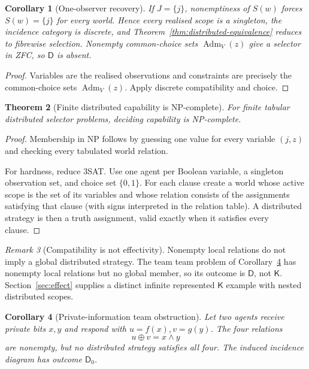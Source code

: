 \documentclass[11pt]{article}
\theoremstyle{plain}
\newtheorem{theorem}{Theorem}[section]
\newtheorem{corollary}[theorem]{Corollary}
\theoremstyle{definition}
\theoremstyle{remark}
\newtheorem{remark}[theorem]{Remark}
\newcommand{\Adm}{\operatorname{Adm}}
\begin{document}
\begin{corollary}[One-observer recovery]\label{cor:distributed-one}
If $J=\{j\}$, nonemptiness of $S(w)$ forces $S(w)=\{j\}$ for every world.
Hence every realised scope is a singleton, the incidence category is discrete,
and Theorem~\ref{thm:distributed-equivalence} reduces to fibrewise selection. Nonempty common-choice sets $\Adm_V(z)$ give a selector in ZFC, so $\mathsf D$ is absent.
\end{corollary}

\begin{proof}
Variables are the realised observations and constraints are precisely the
common-choice sets $\Adm_V(z)$. Apply discrete compatibility and choice.
\end{proof}

\begin{theorem}[Finite distributed capability is NP-complete]
\label{thm:distributed-NP}
For finite tabular distributed selector problems, deciding capability is
NP-complete.
\end{theorem}

\begin{proof}
Membership in NP follows by guessing one value for every variable $(j,z)$ and
checking every tabulated world relation.

For hardness, reduce 3SAT. Use one agent per Boolean variable, a singleton
observation set, and choice set $\{0,1\}$. For each clause create a world whose
active scope is the set of its variables and whose relation consists of the
assignments satisfying that clause (with signs interpreted in the
relation table). A distributed strategy is then a truth assignment, valid
exactly when it satisfies every clause.
\end{proof}

\begin{remark}[Compatibility is not effectivity]
Nonempty local relations do not imply a global distributed strategy. The team
team problem of Corollary~\ref{cor:team-decision} has nonempty local relations but no global member, so its outcome
is $\mathsf D$, not $\mathsf K$. Section~\ref{sec:effect} supplies a distinct infinite represented
$\mathsf K$ example with nested distributed scopes.
\end{remark}



\begin{corollary}[Private-information team obstruction]
\label{cor:team-decision}
Let two agents receive private bits $x,y$ and respond with
$u=f(x),v=g(y)$. The four relations
\[
u\oplus v=x\wedge y
\]
are nonempty, but no distributed strategy satisfies all four. The induced
incidence diagram has outcome $\mathsf D_0$.
\end{corollary}
\end{document}
